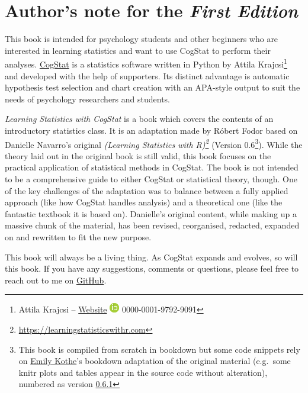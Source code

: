 \documentclass[
  11pt,
]{book}
\theoremstyle{definition}
\theoremstyle{definition}
\theoremstyle{definition}
\theoremstyle{definition}
\theoremstyle{remark}
\begin{document}
\hypertarget{authors-note-for-the-first-edition}{%
\section*{\texorpdfstring{Author's note for the \emph{First Edition}}{Author's note for the First Edition}}\label{authors-note-for-the-first-edition}}

This book is intended for psychology students and other beginners who are interested in learning statistics and want to use CogStat to perform their analyses. \href{https://www.cogstat.org}{CogStat} is a statistics software written in Python by Attila Krajcsi\footnote{Attila Krajcsi -- \href{http://www.attilakrajcsi.hu}{Website} \textbar{} \href{https://orcid.org/0000-0001-9792-9091}{\includegraphics{resources/image/orcid_16x16.png}} 0000-0001-9792-9091} and developed with the help of supporters. Its distinct advantage is automatic hypothesis test selection and chart creation with an APA-style output to suit the needs of psychology researchers and students.

\emph{Learning Statistics with CogStat} is a book which covers the contents of an introductory statistics class. It is an adaptation made by Róbert Fodor based on Danielle Navarro's original \emph{(Learning Statistics with R)\footnote{\url{https://learningstatisticswithr.com}}} (Version 0.6\footnote{This book is compiled from scratch in bookdown but some code snippets rely on \href{https://twitter.com/emilyandthelime}{Emily Kothe}'s bookdown adaptation of the original material (e.g.~some knitr plots and tables appear in the source code without alteration), numbered as version \href{https://learningstatisticswithr.com/book/}{0.6.1}}). While the theory laid out in the original book is still valid, this book focuses on the practical application of statistical methods in CogStat. The book is not intended to be a comprehensive guide to either CogStat or statistical theory, though. One of the key challenges of the adaptation was to balance between a fully applied approach (like how CogStat handles analysis) and a theoretical one (like the fantastic textbook it is based on). Danielle's original content, while making up a massive chunk of the material, has been revised, reorganised, redacted, expanded on and rewritten to fit the new purpose.

This book will always be a living thing. As CogStat expands and evolves, so will this book. If you have any suggestions, comments or questions, please feel free to reach out to me on \href{https://github.com/robertfodor/lsc/issues}{GitHub}.
\end{document}
